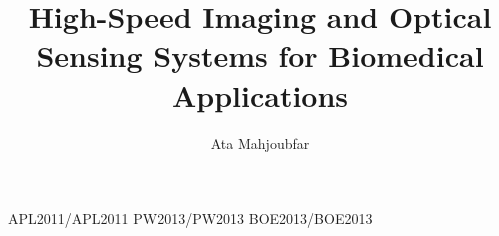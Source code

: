 \documentclass [PhD] {uclathes}
\title          {High-Speed Imaging and Optical Sensing Systems for Biomedical Applications}
\author         {Ata Mahjoubfar}
\begin{document}
\makeintropages

%
%
 {APL2011/APL2011}                         %
 {PW2013/PW2013}                         %
 {BOE2013/BOE2013}





\end{document}
